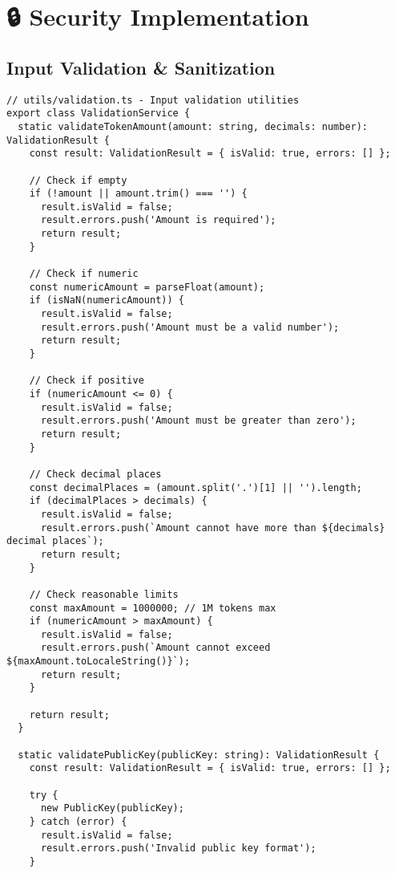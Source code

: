 \documentclass[11pt,a4paper]{article}
\begin{document}
\section{🔒 Security Implementation}

\subsection{Input Validation & Sanitization}

\begin{lstlisting}[style=typescript, caption=Comprehensive Input Validation]
// utils/validation.ts - Input validation utilities
export class ValidationService {
  static validateTokenAmount(amount: string, decimals: number): ValidationResult {
    const result: ValidationResult = { isValid: true, errors: [] };
    
    // Check if empty
    if (!amount || amount.trim() === '') {
      result.isValid = false;
      result.errors.push('Amount is required');
      return result;
    }
    
    // Check if numeric
    const numericAmount = parseFloat(amount);
    if (isNaN(numericAmount)) {
      result.isValid = false;
      result.errors.push('Amount must be a valid number');
      return result;
    }
    
    // Check if positive
    if (numericAmount <= 0) {
      result.isValid = false;
      result.errors.push('Amount must be greater than zero');
      return result;
    }
    
    // Check decimal places
    const decimalPlaces = (amount.split('.')[1] || '').length;
    if (decimalPlaces > decimals) {
      result.isValid = false;
      result.errors.push(`Amount cannot have more than ${decimals} decimal places`);
      return result;
    }
    
    // Check reasonable limits
    const maxAmount = 1000000; // 1M tokens max
    if (numericAmount > maxAmount) {
      result.isValid = false;
      result.errors.push(`Amount cannot exceed ${maxAmount.toLocaleString()}`);
      return result;
    }
    
    return result;
  }
  
  static validatePublicKey(publicKey: string): ValidationResult {
    const result: ValidationResult = { isValid: true, errors: [] };
    
    try {
      new PublicKey(publicKey);
    } catch (error) {
      result.isValid = false;
      result.errors.push('Invalid public key format');
    }
    

\end{lstlisting}
\end{document}
